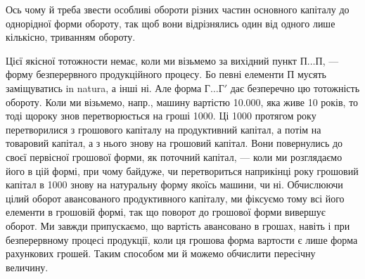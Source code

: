 Ось чому й треба звести особливі обороти різних частин основного
капіталу до однорідної форми обороту, так щоб вони відрізнялись один
від одного лише кількісно, триванням обороту.

\begin{sloppypar}
Цієї якісної тотожности немає, коли ми візьмемо за вихідний пункт
$П\dots{} П$, — форму безперервного продукційного процесу. Бо певні елементи
П мусять заміщуватись in natura, а інші ні. Але форма $Г\dots{} Г'$ дає безперечно
цю тотожність обороту. Коли ми візьмемо, напр., машину вартістю
\num{10.000}, яка живе 10 років, то тоді щороку знов перетворюється
на гроші  \deq{} 1000. Ці 1000 протягом року
перетворилися з грошового капіталу на продуктивний капітал, а потім на
товаровий капітал, а з нього знову на грошовий капітал. Вони повернулись
до своєї первісної грошової форми, як поточний капітал, — коли ми
розглядаємо його в цій формі, при чому байдуже, чи перетвориться наприкінці
року грошовий капітал в 1000 знову на натуральну
форму якоїсь машини, чи ні. Обчислюючи цілий оборот авансованого продуктивного
капіталу, ми фіксуємо тому всі його елементи в грошовій формі,
так що поворот до грошової форми вивершує оборот. Ми завжди припускаємо,
що вартість авансовано в грошах, навіть і при безперервному
процесі продукції, коли ця грошова форма вартости є лише форма
рахункових грошей. Таким способом ми й можемо обчислити пересічну
величину.
\end{sloppypar}